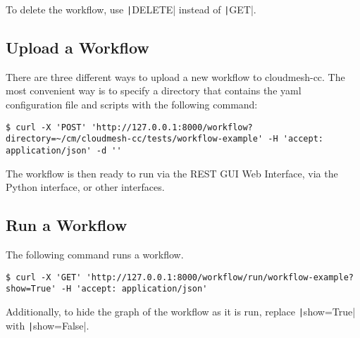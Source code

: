 To delete the workflow, use \texttt|DELETE| instead of \texttt|GET|.

\subsection{Upload a Workflow}\label{upload-a-workflow}

There are three different ways to upload a new workflow to cloudmesh-cc.
The most convenient way is to specify a directory that contains the
yaml configuration file and scripts with the following command:

\begin{verbatim}
$ curl -X 'POST' 'http://127.0.0.1:8000/workflow?directory=~/cm/cloudmesh-cc/tests/workflow-example' -H 'accept: application/json' -d ''
\end{verbatim}
\smallskip

The workflow is then ready to run via the REST GUI Web Interface,
via the Python interface, or other interfaces.

\subsection{Run a Workflow}\label{run-a-workflow}

The following command runs a workflow.

\begin{verbatim}
$ curl -X 'GET' 'http://127.0.0.1:8000/workflow/run/workflow-example?show=True' -H 'accept: application/json'
\end{verbatim}

Additionally, to hide the graph of the workflow as it is run,
replace \texttt|show=True| with \texttt|show=False|.

